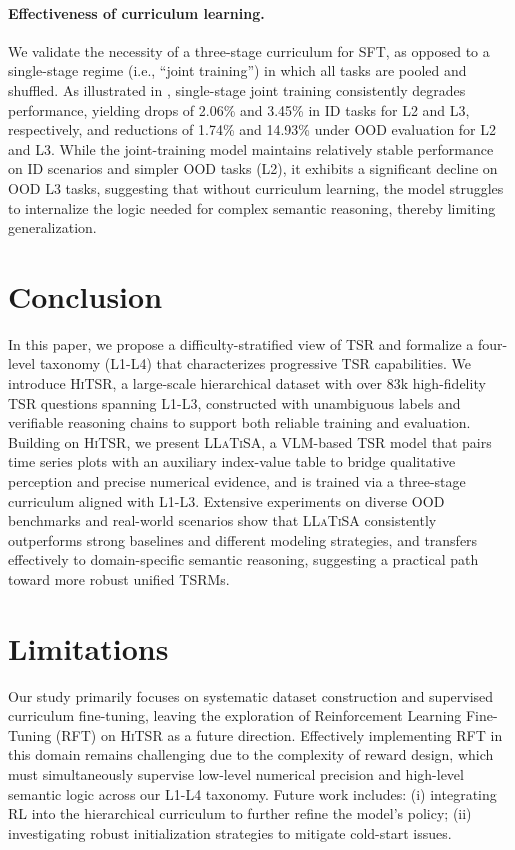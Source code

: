 \documentclass[11pt]{article}
\begin{document}
\paragraph{Effectiveness of curriculum learning.} We validate the necessity of a three-stage curriculum for SFT, as opposed to a single-stage regime (i.e., ``joint training'') in which all tasks are pooled and shuffled. As illustrated in , single-stage joint training consistently degrades performance, yielding drops of 2.06\% and 3.45\% in ID tasks for L2 and L3, respectively, and reductions of 1.74\% and 14.93\% under OOD evaluation for L2 and L3. While the joint-training model maintains relatively stable performance on ID scenarios and simpler OOD tasks (L2), it exhibits a significant decline on OOD L3 tasks, suggesting that without curriculum learning, the model struggles to internalize the logic needed for complex semantic reasoning, thereby limiting generalization.

\section{Conclusion}
In this paper, we propose a difficulty-stratified view of TSR and formalize a four-level taxonomy (L1-L4) that characterizes progressive TSR capabilities. We introduce \textsc{HiTSR}, a large-scale hierarchical dataset with over 83k high-fidelity TSR questions spanning L1-L3, constructed with unambiguous labels and verifiable reasoning chains to support both reliable training and evaluation. Building on \textsc{HiTSR}, we present \textsc{LLaTiSA}, a VLM-based TSR model that pairs time series plots with an auxiliary index-value table to bridge qualitative perception and precise numerical evidence, and is trained via a three-stage curriculum aligned with L1-L3. Extensive experiments on diverse OOD benchmarks and real-world scenarios show that \textsc{LLaTiSA} consistently outperforms strong baselines and different modeling strategies, and transfers effectively to domain-specific semantic reasoning, suggesting a practical path toward more robust unified TSRMs.

\section*{Limitations}

Our study primarily focuses on systematic dataset construction and supervised curriculum fine-tuning, leaving the exploration of Reinforcement Learning Fine-Tuning (RFT) on \textsc{HiTSR} as a future direction. Effectively implementing RFT in this domain remains challenging due to the complexity of reward design, which must simultaneously supervise low-level numerical precision and high-level semantic logic across our L1-L4 taxonomy. Future work includes: (i) integrating RL into the hierarchical curriculum to further refine the model's policy; (ii) investigating robust initialization strategies to mitigate cold-start issues.
\end{document}
